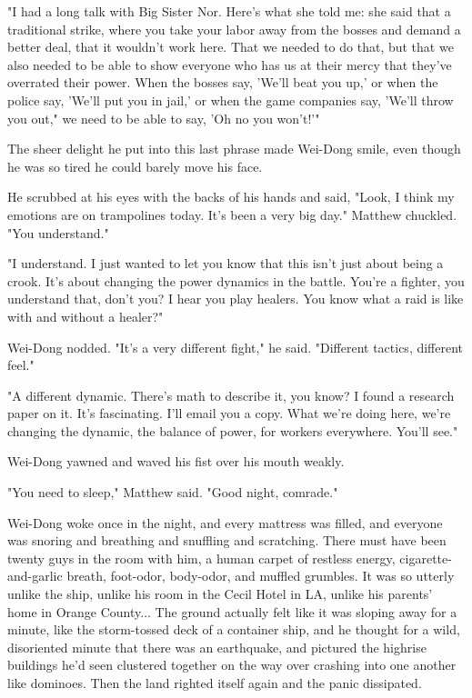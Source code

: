 "I had a long talk with Big Sister Nor. Here's what she told me:
she said that a traditional strike, where you take your labor away
from the bosses and demand a better deal, that it wouldn't work
here. That we needed to do that, but that we also needed to be able
to show everyone who has us at their mercy that they've overrated
their power. When the bosses say, 'We'll beat you up,' or when the
police say, 'We'll put you in jail,' or when the game companies
say, 'We'll throw you out," we need to be able to say, 'Oh no you
won't!'"

The sheer delight he put into this last phrase made Wei-Dong smile,
even though he was so tired he could barely move his face.

He scrubbed at his eyes with the backs of his hands and said,
"Look, I think my emotions are on trampolines today. It's been a
very big day." Matthew chuckled. "You understand."

"I understand. I just wanted to let you know that this isn't just
about being a crook. It's about changing the power dynamics in the
battle. You're a fighter, you understand that, don't you? I hear
you play healers. You know what a raid is like with and without a
healer?"

Wei-Dong nodded. "It's a very different fight," he said. "Different
tactics, different feel."

"A different dynamic. There's math to describe it, you know? I
found a research paper on it. It's fascinating. I'll email you a
copy. What we're doing here, we're changing the dynamic, the
balance of power, for workers everywhere. You'll see."

Wei-Dong yawned and waved his fist over his mouth weakly.

"You need to sleep," Matthew said. "Good night, comrade."

Wei-Dong woke once in the night, and every mattress was filled, and
everyone was snoring and breathing and snuffling and scratching.
There must have been twenty guys in the room with him, a human
carpet of restless energy, cigarette-and-garlic breath, foot-odor,
body-odor, and muffled grumbles. It was so utterly unlike the ship,
unlike his room in the Cecil Hotel in LA, unlike his parents' home
in Orange County... The ground actually felt like it was sloping
away for a minute, like the storm-tossed deck of a container ship,
and he thought for a wild, disoriented minute that there was an
earthquake, and pictured the highrise buildings he'd seen clustered
together on the way over crashing into one another like dominoes.
Then the land righted itself again and the panic dissipated.

